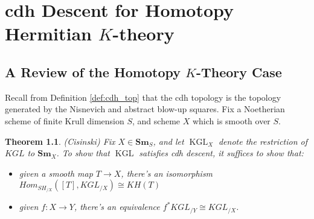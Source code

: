 \documentclass[edeposit,fullpage]{uiucthesis2009}
\newcommand{\mbb}{\mathbb}
\newcommand{\Sm}[1]{\mathbf{Sm}_{#1}}
\DeclareMathOperator{\iHom}{\mathbf{Hom}}
\DeclareMathOperator{\KGL}{KGL}
\theoremstyle{plain}
\numberwithin{lemma}{section}
\newtheorem{theorem}[lemma]{Theorem}
\theoremstyle{definition}
\begin{document}



\chapter{cdh Descent for Homotopy Hermitian $K$-theory}\label{chap:cdh}

\section{A Review of the Homotopy $K$-Theory Case}

Recall from Definition \ref{def:cdh_top} that the cdh topology is the
topology generated by the Nisnevich and abstract blow-up squares. Fix
a Noetherian scheme of finite Krull dimension $S$, and scheme $X$
which is smooth over $S$.

\begin{theorem}(Cisinski)
Fix $X \in \Sm{S}$, and let $\KGL_X$ denote the restriction of $KGL$
to $\Sm{X}$. To show that $\KGL$ satisfies cdh descent, it suffices to
show that:
\begin{itemize}
\item given a smooth map $T \rightarrow X$, there's an isomorphism
  $Hom_{SH_{/X}}([T], KGL_{/X}) \cong KH(T)$
\item given $f : X \rightarrow Y$, there's an equivalence $f^* KGL_{/Y} \cong KGL_{/X}$.
\end{itemize}
\end{theorem}
\end{document}
